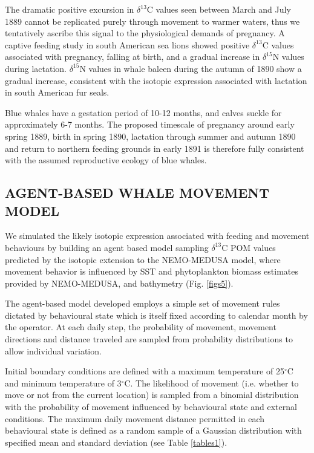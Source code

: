 \documentclass[a4paper,12pt]{article}
\begin{document}
The dramatic positive excursion in $\delta^{13}$C values seen between March and July 1889 cannot be replicated purely through movement to warmer waters, thus we tentatively ascribe this signal to the physiological demands of pregnancy.  
A captive feeding study in south American sea lions\cite{cardona2017temporal} showed positive $\delta^{13}$C values associated with pregnancy, falling at birth, and a gradual increase in $\delta^{15}$N  values during lactation. 
$\delta^{15}$N values in whale baleen during the autumn of 1890 show a gradual increase, consistent with the isotopic expression associated with lactation in south American fur seals\cite{cardona2017temporal}.
 
Blue whales have a gestation period of 10-12 months, and calves suckle for approximately 6-7 months\cite{handbook}. 
The proposed timescale of pregnancy around early spring 1889, birth in spring 1890, lactation through summer and autumn 1890 and return to northern feeding grounds in early 1891 is therefore fully consistent with the assumed reproductive ecology of blue whales.
 
\subsection*{AGENT-BASED WHALE MOVEMENT MODEL}
We simulated the likely isotopic expression associated with feeding and movement behaviours by building an agent based model sampling $\delta^{13}$C POM values predicted by the isotopic extension to the NEMO-MEDUSA model\cite{magozzi2017using,yool2013medusa}, where movement behavior is influenced by SST and phytoplankton biomass estimates provided by NEMO-MEDUSA\cite{yool2013medusa}, and bathymetry (Fig. \ref{figs5}).
 
The agent-based model developed employs a simple set of movement rules dictated by behavioural state which is itself fixed according to calendar month by the operator. 
At each daily step, the probability of movement, movement directions and distance traveled are sampled from probability distributions to allow individual variation.

 
Initial boundary conditions are defined with a maximum temperature of 25$^{\circ}$C and minimum temperature of 3$^{\circ}$C. The likelihood of movement (i.e. whether to move or not from the current location) is sampled from a binomial distribution with the probability of movement influenced by behavioural state and external conditions. The maximum daily movement distance permitted in each behavioural state is defined as a random sample of a Gaussian distribution with specified mean and standard deviation (see Table \ref{tables1}).
 
\end{document}
